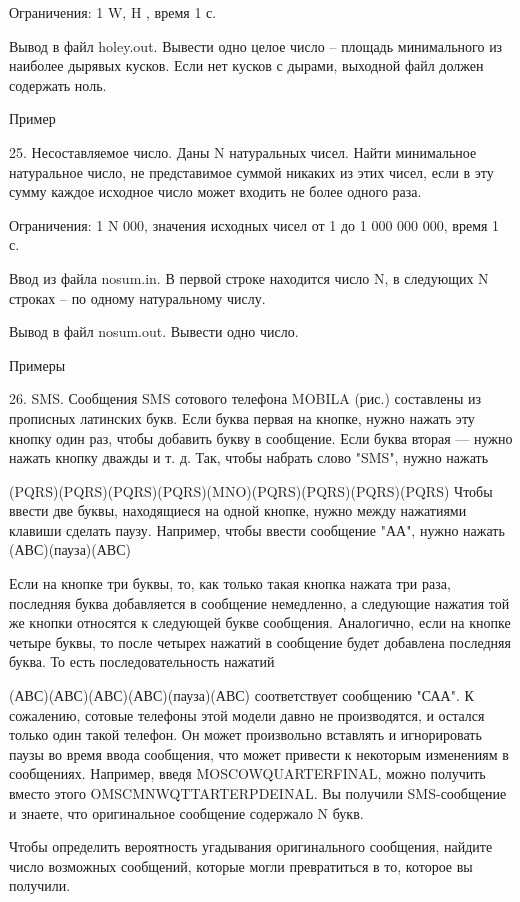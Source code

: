 \documentclass[]{article}
\begin{document}
Ограничения: 1 \leq W, H , время 1 с.

Вывод в файл holey.out. Вывести одно целое число – площадь минимального из наиболее дырявых кусков. Если нет кусков с дырами, выходной файл должен содержать ноль.

Пример



25. Несоставляемое число. Даны N натуральных чисел. Найти минимальное натуральное число, не представимое суммой никаких из этих чисел, если в эту сумму каждое исходное число может входить не более одного раза.

Ограничения: 1 \leq N  000, значения исходных чисел от 1 до 1 000 000 000, время 1 с.

Ввод из файла nosum.in. В первой строке находится число N, в следующих N строках – по одному натуральному числу.

Вывод в файл nosum.out. Вывести одно число.

Примеры



26. SMS. Сообщения SMS сотового телефона MOBILA (рис.) составлены из прописных латинских букв. Если буква первая на кнопке, нужно нажать эту кнопку один раз, чтобы добавить букву в сообщение. Если буква вторая — нужно нажать кнопку дважды и т. д. Так, чтобы набрать слово "SMS", нужно нажать

(PQRS)(PQRS)(PQRS)(PQRS)(MNO)(PQRS)(PQRS)(PQRS)(PQRS)
Чтобы ввести две буквы, находящиеся на одной кнопке, нужно между нажатиями клавиши сделать паузу. Например, чтобы ввести сообщение "АА", нужно нажать (АВС)(пауза)(АВС)

Если на кнопке три буквы, то, как только такая кнопка нажата три раза, последняя буква добавляется в сообщение немедленно, а следующие нажатия той же кнопки относятся к следующей букве сообщения. Аналогично, если на кнопке четыре буквы, то после четырех нажатий в сообщение будет добавлена последняя буква. То есть последовательность нажатий

(АВС)(АВС)(АВС)(АВС)(пауза)(АВС)
соответствует сообщению "САА". К сожалению, сотовые телефоны этой модели давно не производятся, и остался только один такой телефон. Он может произвольно вставлять и игнорировать паузы во время ввода сообщения, что может привести к некоторым изменениям в сообщениях. Например, введя MOSCOWQUARTERFINAL, можно получить вместо этого OMSCMNWQTTARTERPDEINAL. Вы получили SMS-сообщение и знаете, что оригинальное сообщение содержало N букв.

Чтобы определить вероятность угадывания оригинального сообщения, найдите число возможных сообщений, которые могли превратиться в то, которое вы получили.
\end{document}
